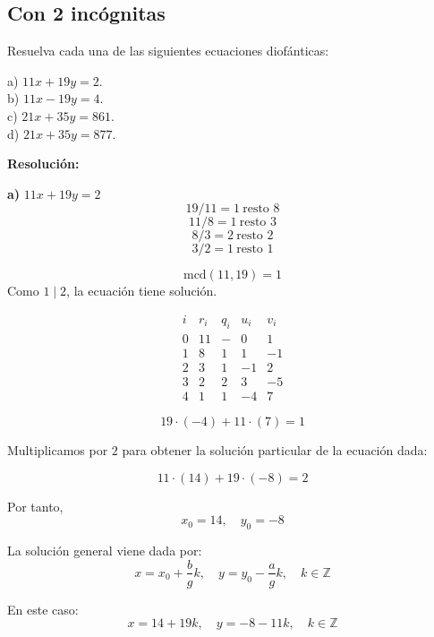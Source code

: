 \documentclass[a4paper,12pt]{article}
\begin{document}
\subsection{Con 2 incógnitas}

\begin{ejercicio}[title=Ejercicio 9]
Resuelva cada una de las siguientes ecuaciones diofánticas:

a) $11x + 19y = 2$.\\
b) $11x - 19y = 4$.\\
c) $21x + 35y = 861$.\\
d) $21x + 35y = 877$.

\tcblower
\textbf{Resolución:}

\textbf{a) } $11x + 19y = 2$
\[
19 / 11 = 1 \ \text{resto } 8
\]
\[
11 / 8 = 1 \ \text{resto } 3
\]
\[
8 / 3 = 2 \ \text{resto } 2
\]
\[
3 / 2 = 1 \ \text{resto } \boxed{1}
\]

\[
\text{mcd}(11,19) = \boxed{1}
\]
Como $1 \mid 2$, la ecuación tiene solución.

\[
\begin{array}{c|c|c|c|c}
i & r_i & q_i & u_i & v_i\\
\hline
0 & 11 & - & 0 & 1\\
1 & 8 & 1 & 1 & -1\\
2 & 3 & 1 & -1 & 2\\
3 & 2 & 2 & 3 & -5\\
4 & \boxed{1} & 1 & -4 & 7
\end{array}
\]

\[
19 \cdot (-4) + 11 \cdot (7) = 1
\]

Multiplicamos por $2$ para obtener la solución particular de la ecuación dada:

\[
11 \cdot (14) + 19 \cdot (-8) = 2
\]

Por tanto,
\[
x_0 = 14, \quad y_0 = -8
\]

La solución general viene dada por:
\[
x = x_0 + \frac{b}{g}k, \quad y = y_0 - \frac{a}{g}k, \quad k \in \mathbb{Z}
\]

En este caso:
\[
\boxed{
x = 14 + 19k, \quad y = -8 - 11k, \quad k \in \mathbb{Z}
}
\]

\end{ejercicio}
\end{document}
